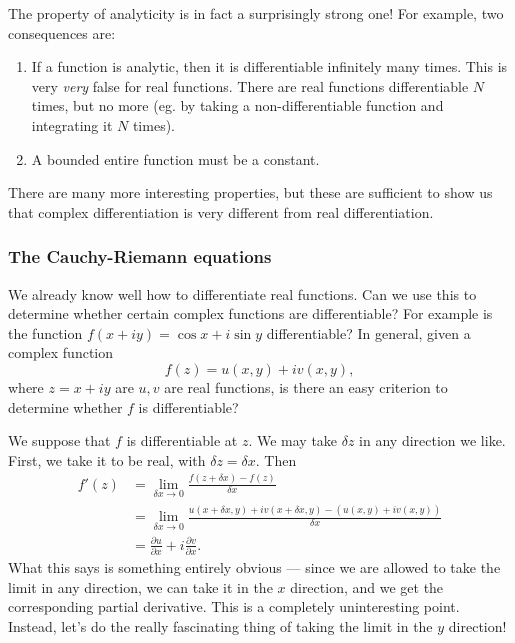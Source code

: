\documentclass[a4paper]{article}
\begin{document}
The property of analyticity is in fact a surprisingly strong one! For example, two consequences are:
\begin{enumerate}
  \item If a function is analytic, then it is differentiable infinitely many times. This is very \emph{very} false for real functions. There are real functions differentiable $N$ times, but no more (eg. by taking a non-differentiable function and integrating it $N$ times).
  \item A bounded entire function must be a constant.
\end{enumerate}
There are many more interesting properties, but these are sufficient to show us that complex differentiation is very different from real differentiation.
\subsubsection*{The Cauchy-Riemann equations}
We already know well how to differentiate real functions. Can we use this to determine whether certain complex functions are differentiable? For example is the function $f(x + iy) = \cos x + i\sin y$ differentiable? In general, given a complex function
\[
  f(z) = u(x, y) + iv(x, y),
\]
where $z = x + iy$ are $u, v$ are real functions, is there an easy criterion to determine whether $f$ is differentiable?

We suppose that $f$ is differentiable at $z$. We may take $\delta z$ in any direction we like. First, we take it to be real, with $\delta z = \delta x$. Then
\begin{align*}
  f'(z) &= \lim_{\delta x \to 0} \frac{f(z + \delta x) - f(z)}{\delta x}\\
  &= \lim_{\delta x \to 0} \frac{u(x + \delta x, y) + iv(x + \delta x, y) - (u(x, y) + iv(x, y))}{\delta x}\\
  &= \frac{\partial u}{\partial x} + i \frac{\partial v}{\partial x}.
\end{align*}
What this says is something entirely obvious --- since we are allowed to take the limit in any direction, we can take it in the $x$ direction, and we get the corresponding partial derivative. This is a completely uninteresting point. Instead, let's do the really fascinating thing of taking the limit in the $y$ direction!
\end{document}
